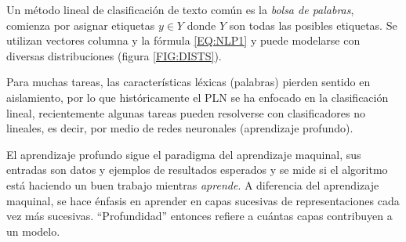 Un método lineal de clasificación de texto común es la \emph{bolsa de palabras}, comienza por asignar etiquetas $y\in Y$ donde $Y$ son todas las posibles etiquetas. Se utilizan vectores columna y la fórmula \ref{EQ:NLP1} y puede modelarse con diversas distribuciones (figura \ref{FIG:DISTS}).

Para muchas tareas, las características léxicas (palabras) pierden sentido en aislamiento, por lo que históricamente el PLN se ha enfocado en la clasificación lineal, recientemente algunas tareas pueden resolverse con clasificadores no lineales, es decir, por medio de redes neuronales (aprendizaje profundo).

El aprendizaje profundo sigue el paradigma del aprendizaje maquinal, sus entradas son datos y ejemplos de resultados esperados y se mide si el algoritmo está haciendo un buen trabajo mientras \emph{aprende}. A diferencia del aprendizaje maquinal, se hace énfasis en aprender en capas sucesivas de representaciones cada vez más sucesivas. ``Profundidad'' entonces refiere a cuántas capas contribuyen a un modelo.